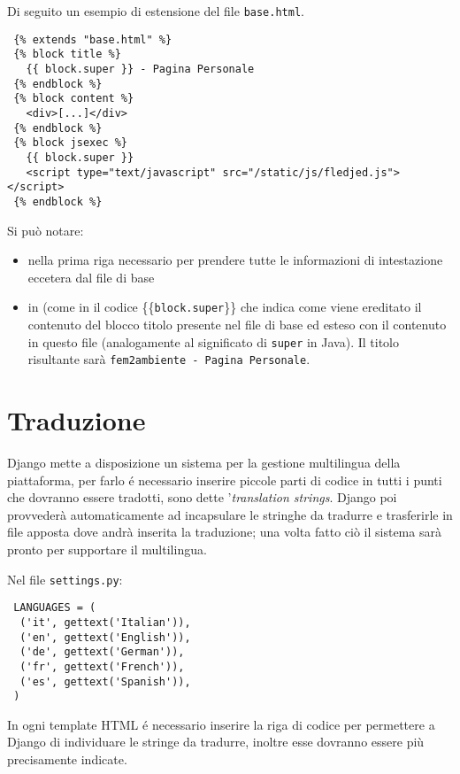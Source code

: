 Di seguito un esempio di estensione del file \texttt{base.html}.

\begin{footnotesize}
\begin{verbatim}
 {% extends "base.html" %}
 {% block title %}
   {{ block.super }} - Pagina Personale
 {% endblock %}
 {% block content %}
   <div>[...]</div>
 {% endblock %}
 {% block jsexec %}
   {{ block.super }}
   <script type="text/javascript" src="/static/js/fledjed.js"></script>
 {% endblock %}
\end{verbatim}
\end{footnotesize}

Si può notare:
\begin{itemize}
 \item nella prima riga  necessario per prendere tutte le informazioni di intestazione eccetera dal file di base
 \item in  (come in  il codice \{\{\texttt{block.super}\}\} che indica come viene ereditato il contenuto del blocco titolo presente nel file di base ed esteso con il contenuto in questo file (analogamente al significato di \texttt{super} in Java). Il titolo risultante sarà \texttt{fem2ambiente - Pagina Personale}.
\end{itemize}


\section*{Traduzione}
\label{app:traduzione}
Django mette a disposizione un sistema per la gestione multilingua della piattaforma, per farlo é necessario inserire piccole parti di codice in tutti i punti che dovranno essere tradotti, sono dette '\emph{translation strings}. Django poi provvederà automaticamente ad incapsulare le stringhe da tradurre e trasferirle in file apposta dove andrà inserita la traduzione; una volta fatto ciò il sistema sarà pronto per supportare il multilingua.

Nel file \texttt{settings.py}:
\begin{footnotesize}
\begin{verbatim}
 LANGUAGES = (
  ('it', gettext('Italian')),
  ('en', gettext('English')),
  ('de', gettext('German')),
  ('fr', gettext('French')),
  ('es', gettext('Spanish')),
 )
\end{verbatim}
\end{footnotesize}

In ogni template HTML é necessario inserire la riga di codice  per permettere a Django di individuare le stringe da tradurre, inoltre esse dovranno essere più precisamente indicate. 

